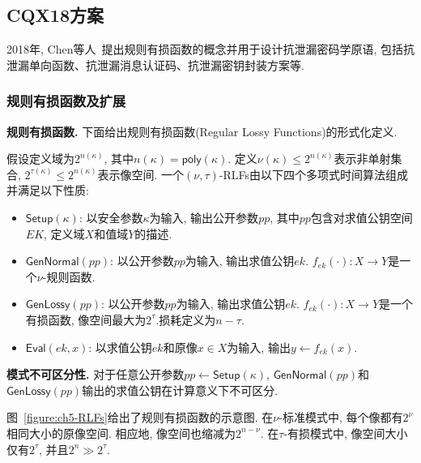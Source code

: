 \subsection{CQX18方案}
2018年, Chen等人~\cite{Chen-TCS-2018,Chen-CTRSA-2018}提出规则有损函数的概念并用于设计抗泄漏密码学原语, 包括抗泄漏单向函数、抗泄漏消息认证码、抗泄漏密钥封装方案等.
\subsubsection{规则有损函数及扩展}
\medskip\noindent\textbf{规则有损函数.} 下面给出规则有损函数(Regular Lossy Functions)的形式化定义.
\begin{definition}[规则有损函数]
假设定义域为$2^{n(\kappa)}$, 其中$n(\kappa) = \mathsf{poly}(\kappa)$. 定义$\nu(\kappa) \leq 2^{n(\kappa)}$表示非单射集合, $2^{\tau(\kappa)} \leq 2^{n(\kappa)}$表示像空间. 一个$(\nu, \tau)$-RLFs由以下四个多项式时间算法组成并满足以下性质:
\begin{itemize} \itemsep 1pt \parskip 0pt \parsep 0pt
\item $\mathsf{Setup}(\kappa)$: 以安全参数$\kappa$为输入, 输出公开参数$pp$, 其中$pp$包含对求值公钥空间$EK$, 定义域$X$和值域$Y$的描述. 

\item $\mathsf{GenNormal}(pp)$: 以公开参数$pp$为输入, 输出求值公钥$ek$. 
	$f_{ek}(\cdot): X \rightarrow Y$是一个$\nu$-规则函数. 

\item $\mathsf{GenLossy}(pp)$: 以公开参数$pp$为输入, 输出求值公钥$ek$.  
	$f_{ek}(\cdot): X \rightarrow Y$是一个有损函数, 像空间最大为$2^\tau$.损耗定义为$n - \tau$. 

\item $\mathsf{Eval}(ek, x)$: 以求值公钥$ek$和原像$x \in X$为输入, 输出$y \leftarrow f_{ek}(x)$. 
\end{itemize}

\begin{trivlist}
\item \textbf{模式不可区分性.} 对于任意公开参数$pp \leftarrow \mathsf{Setup}(\kappa)$, $\mathsf{GenNormal}(pp)$和$\mathsf{GenLossy}(pp)$输出的求值公钥在计算意义下不可区分.
\end{trivlist}
\end{definition}

图~\ref{figure:ch5-RLFs}给出了规则有损函数的示意图. 在$\nu$-标准模式中, 每个像都有$2^{\nu}$相同大小的原像空间. 相应地, 像空间也缩减为$2^{n - \nu}$. 在$\tau$-有损模式中, 像空间大小仅有$2^{\tau}$, 并且$2^n \gg 2^{\tau}$. 


